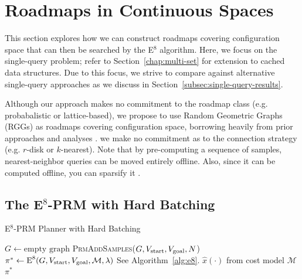 \clearpage
\section{Roadmaps in Continuous Spaces}
\label{chap:graphs-in-continuous}

This section explores how we can construct roadmaps covering
configuration space that can then be searched by the E$^8$ algorithm.
Here,
we focus on the single-query problem;
refer to Section~\ref{chap:multi-set}
for extension to cached data structures.
Due to this focus,
we strive to compare against alternative single-query approaches
as we discuss in Section~\ref{subsec:single-query-results}.

Although
our approach makes no commitment to the roadmap class
(e.g. probabalistic or lattice-based),
we propose to use Random Geometric Graphs (RGGs)
as roadmaps covering configuration space,
borrowing heavily from prior approaches \citep{kavrakietal1996prm}
and analyses \citep{karaman2011samplingoptimal}.
we make no commitment as to the connection strategy
(e.g. $r$-disk or $k$-nearest).
Note that by pre-computing a sequence of samples,
nearest-neighbor queries can be moved entirely offline.
Also,
since it can be computed offline,
you can sparsify it \citep{shaharabani2013sparsification}.

\subsection{The E$^8$-PRM with Hard Batching}

\begin{algorithm}
\caption{E$^8$-PRM Planner with Hard Batching}
\label{alg:e8-prm-hard}
\begin{algorithmic}[1]
\State $G \leftarrow \mbox{empty graph}$
\Loop
   \State \textsc{PrmAddSamples}($G,
      V_{\mbox{\scriptsize start}}, V_{\mbox{\scriptsize goal}},
      N$)
   \State $\pi^* \leftarrow \mbox{E}^8(G,
      V_{\mbox{\scriptsize start}}, V_{\mbox{\scriptsize goal}},
      \mathcal{M}, \lambda)$
      \Comment See Algorithm~\ref{alg:e8}.
      \Comment $\hat{x}(\cdot)$ from cost model $\mathcal{M}$
      \State \Return $\pi^*$
   \EndIf
\EndLoop
\EndProcedure
\end{algorithmic}
\end{algorithm}

